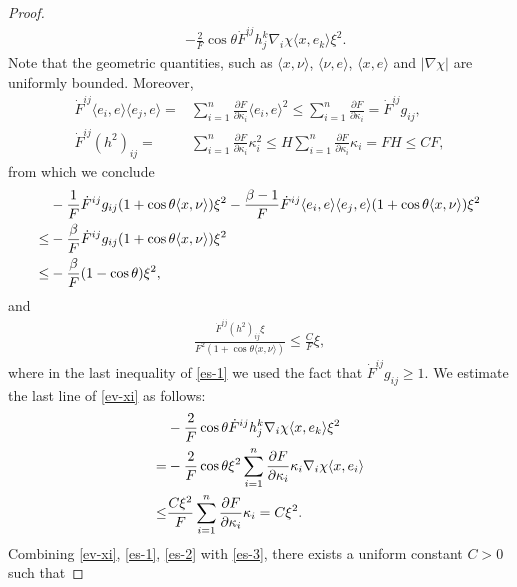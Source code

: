 \documentclass[10pt,a4paper]{amsart}
\begin{document}
\begin{proof}
\begin{align}
	&-\frac{2}{F}\cos\theta\dot{F}^{ij}h_j^k\nabla_i \chi \langle x,e_k\rangle\xi^2.\label{ev-xi}
\end{align}
Note that the geometric quantities, such as $\langle x,\nu\rangle$, $\langle \nu,e\rangle$, $\langle x,e\rangle$ and $|\nabla\chi|$ are uniformly bounded. Moreover, 
\begin{align*}
	\dot{F}^{ij}\langle e_i,e\rangle\langle e_j,e\rangle=&\sum_{i=1}^n\frac{\partial F}{\partial\kappa_i}\langle e_i,e\rangle^2\leq \sum_{i=1}^n\frac{\partial F}{\partial\kappa_i}=\dot{F}^{ij}g_{ij},\\
	\dot{F}^{ij}(h^2)_{ij}=&\sum_{i=1}^n{\frac{\partial F}{\partial \kappa_i}\kappa_i^2}\leq H\sum_{i=1}^n\frac{\partial F}{\partial\kappa_i}\kappa_i=FH\leq CF,
\end{align*}
from which we conclude
\begin{align}
	&-\frac{1}{F}\dot{F}^{ij}g_{ij}(1+\cos\theta\langle x,\nu \rangle)\xi^2-\frac{\beta-1}{F}\dot{F}^{ij}\langle e_i,e\rangle \langle e_j,e\rangle(1+\cos\theta\langle x,\nu \rangle)\xi^2\notag\\
	\leq&-\frac{\beta}{F}\dot{F}^{ij}g_{ij}(1+\cos\theta\langle x,\nu \rangle)\xi^2\notag\\
	\leq&-\frac{\beta}{F}(1-\cos\theta)\xi^2,\label{es-1}
\end{align}
and
\begin{align}
	\frac{\dot{F}^{ij}(h^2)_{ij}\xi}{F^2(1+\cos\theta\langle x,\nu \rangle)}\leq \frac{C}{F}\xi,\label{es-2}
\end{align}
where in the last inequality of \eqref{es-1} we used the fact that $\dot{F}^{ij}g_{ij}\geq 1$. We estimate the last line of \eqref{ev-xi} as follows:
\begin{align}
	&-\frac{2}{F}\cos\theta\dot{F}^{ij}h_j^k\nabla_i \chi \langle x,e_k\rangle\xi^2\notag\\
	=&-\frac{2}{F}\cos\theta\xi^2\sum_{i=1}^n{\frac{\partial F}{\partial\kappa_i}\kappa_i}\nabla_i\chi \langle x,e_i\rangle\notag\\
	\leq&\frac{C\xi^2}{F}\sum_{i=1}^n{\frac{\partial F}{\partial\kappa_i}\kappa_i}
	=C\xi^2.\label{es-3}
\end{align}
Combining \eqref{ev-xi}, \eqref{es-1}, \eqref{es-2} with \eqref{es-3}, there exists a uniform constant $C>0$ such that 


\end{proof}
\end{document}
